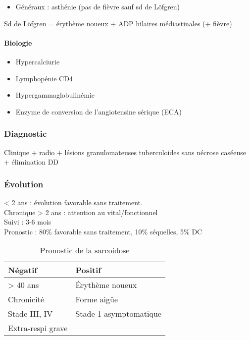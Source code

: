 \documentclass[11pt]{article}
\begin{document}
\begin{itemize}
\item Généraux : asthénie (pas de fièvre sauf sd de Löfgren)
\end{itemize}

Sd de Löfgren = érythème noueux + ADP hilaires médiastinales (+ fièvre)
\paragraph{Biologie}
\label{sec:orgd83e863}
\label{sec:orgbfe5d87}

\begin{itemize}
\item Hypercalciurie
\item Lymphopénie CD4
\item Hypergammaglobulinémie
\item Enzyme de conversion de l'angiotensine sérique (ECA)
\end{itemize}

\subsubsection{Diagnostic}
\label{sec:org2ff52af}
\label{sec:org6670330}
Clinique + radio + lésions granulomateuses tuberculoides sans nécrose caséeuse +
élimination DD
\subsubsection{Évolution}
\label{sec:org405beb5}
\label{sec:org707f9ea}
< 2 ans : évolution favorable sans traitement.\\
Chronique > 2 ans : attention au vital/fonctionnel \\
Suivi : 3-6 mois\\
Pronostic : 80\% favorable sans traitement, 10\% séquelles, 5\% DC

\begin{table}[htbp]
  \caption{Pronostic de la sarcoidose}
  \centering
  \begin{tabular}{ll}
    \toprule
    Négatif & Positif\\
    \midrule
    > 40 ans & Érythème noueux\\
    Chronicité & Forme aigüe\\
    Stade III, IV & Stade 1 asymptomatique\\
    Extra-respi grave & \\
    \bottomrule
  \end{tabular}
\end{table}
\end{document}
